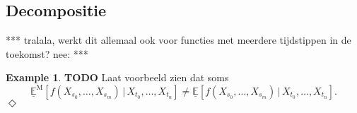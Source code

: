 \documentclass[10pt]{paper}
\theoremstyle{definition}
\newtheorem{exmp}{Example}%
\newtheorem{theorem}{Theorem}
\newcommand{\reals}{\mathbb{R}}
\newcommand{\realspos}{\reals_{>0}}
\newcommand{\realsnonneg}{\reals_{\geq 0}}
\newcommand{\states}{\mathcal{X}}
\newcommand{\processes}{\mathbb{P}}
\newcommand{\mprocesses}{\processes^{\mathrm{M}}}
\newcommand{\gambles}{\mathcal{L}}
\newcommand{\rateset}{\mathcal{Q}}
\newcommand{\lrate}{\underline{Q}}
\newcommand{\norm}[1]{\left\lVert #1 \right\rVert}
\newcommand{\exampleend}{\hfill$\Diamond$}
\begin{document}

\subsection{Decompositie}\label{sec:decomposition}

*** tralala, werkt dit allemaal ook voor functies met meerdere tijdstippen in de toekomst? nee: ***

\begin{exmp}
{\bf TODO} Laat voorbeeld zien dat soms
\begin{equation*}
\underline{\mathbb{E}}^\mathrm{M}[f(X_{s_0},\ldots,X_{s_m})\,\vert\,X_{t_0},\ldots,X_{t_n}] \neq \underline{\mathbb{E}}[f(X_{s_0},\ldots,X_{s_m})\,\vert\,X_{t_0},\ldots,X_{t_n}].
\end{equation*}
\exampleend
\end{exmp}
\end{document}
